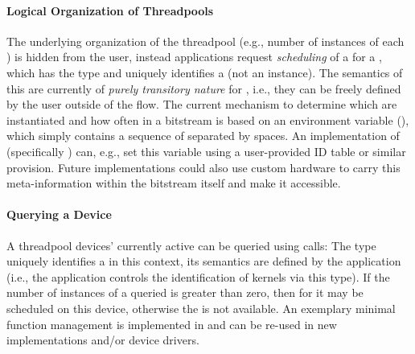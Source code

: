 \paragraph{Logical Organization of Threadpools}
The underlying organization of the threadpool (e.g., number of instances of each ) is hidden from the  user, instead applications request \emph{scheduling} of a  for a , which has the type  and uniquely identifies a  (not an instance).
The semantics of this  are currently of \emph{purely transitory nature} for \tapasco{}, i.e., they can be freely defined by the user outside of the flow.
The current mechanism to determine which  are instantiated and how often in a bitstream is based on an environment variable (), which simply contains a sequence of  separated by spaces.
An implementation of  (specifically ) can, e.g.,  set this variable using a user-provided ID table or similar provision.
Future  implementations could also use custom hardware to carry this meta-information within the bitstream itself and make it accessible.

\paragraph{Querying a Device}
A threadpool devices' currently active  can be queried using  calls:
The type  uniquely identifies a  in this context, its semantics are defined by the application (i.e., the application controls the identification of kernels via this type).
If the number of instances of a queried  is greater than zero, then  for it may be scheduled on this device, otherwise the  is not available.
An exemplary minimal function management is implemented in  and can be re-used in new implementations and/or device drivers.

